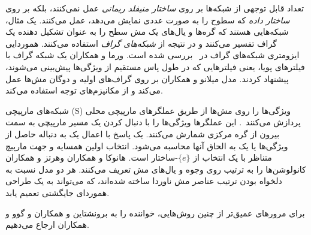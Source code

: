 تعداد قابل توجهی از شبکه‌ها بر روی \emph{ساختار منیفلد ریمانی} عمل نمی‌کنند، بلکه بر روی \emph{ساختار داده} که سطوح را به صورت عددی نمایش می‌دهد، عمل می‌کنند.
یک مثال، شبکه‌هایی هستند که گره‌ها و یال‌های یک مش سطح را به عنوان تشکیل دهنده یک گراف تفسیر می‌کنند و در نتیجه از \emph{شبکه‌های گراف} استفاده می‌کنند.
هموردایی ایزومتری شبکه‌های گراف در~\cite{khasanova2018isometric,horie2020isometric} بررسی شده است.
ورما و همکاران\cite{verma2018feastnet} یک شبکه گراف با فیلترهای پویا، یعنی فیلترهایی که در طول پاس مستقیم از ویژگی‌ها پیش‌بینی می‌شوند، پیشنهاد کردند.
مدل میلانو و همکاران\cite{milano2020primaldual} بر روی گراف‌های اولیه و دوگان مش‌ها عمل می‌کند و از مکانیزم‌های توجه استفاده می‌کند.

شبکه‌های مارپیچی (S) ویژگی‌ها را روی مش‌ها از طریق عملگرهای مارپیچی محلی پردازش می‌کنند~\cite{lim2018simple,gong2019spiralnet++}.
این عملگرها ویژگی‌ها را با دنبال کردن یک مسیر مارپیچی به سمت بیرون از گره مرکزی شمارش می‌کنند.
یک پاسخ با اعمال یک  به دنباله حاصل از ویژگی‌ها یا یک  به الحاق آنها محاسبه می‌شود.
انتخاب اولین همسایه و جهت مارپیچ متناظر با یک انتخاب از $\{e\}$-ساختار است.
هانوکا و همکاران\cite{hanocka2019meshcnn} وهرتز و همکاران \cite{hertz2020GeomTextureSynthesis} کانولوشن‌ها را به ترتیب روی وجوه و یال‌های مش تعریف می‌کنند.
هر دو مدل نسبت به دلخواه بودن ترتیب عناصر مش ناوردا ساخته شده‌اند، که می‌تواند به یک طراحی هموردای جایگشتی تعمیم یابد.

برای مرورهای عمیق‌تر از چنین روش‌هایی، خواننده را به برونشتاین و همکاران\cite{bronstein2017geometric} و گوو و همکاران\cite{guo2020deep} ارجاع می‌دهیم.